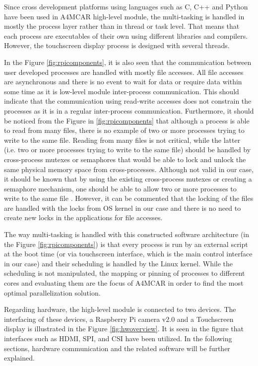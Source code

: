 Since cross development platforms using languages such as C, C++ and Python have been used in A4MCAR high-level module, the multi-tasking is handled in mostly the process layer rather than in thread or task level. That means that each process are executables of their own using different libraries and compilers. However, the touchscreen display process is designed with several threads.

In the Figure \ref{fig:rpicomponents}, it is also seen that the communication between user developed processes are handled with mostly file accesses. All file accesses are asynchronous and there is no event to wait for data or require data within some time as it is low-level module inter-process communication. This should indicate that the communication using read-write accesses does not constrain the processes as it is in a regular inter-process communication. Furthermore, it should be noticed from the Figure in \ref{fig:rpicomponents} that although a process is able to read from many files, there is no example of two or more processes trying to write to the same file. Reading from many files is not critical, while the latter (i.e. two or more processes trying to write to the same file) should be handled by cross-process mutexes or semaphores that would be able to lock and unlock the same physical memory space from cross-processes. Although not valid in our case, it should be known that by using the existing cross-process mutexes or creating a semaphore mechanism, one should be able to allow two or more processes to write to the same file \cite{linuxkernelbook}. However, it can be commented that the locking of the files are handled with the locks from OS kernel in our case and there is no need to create new locks in the applications for file accesses.

The way multi-tasking is handled with this constructed software architecture (in the Figure \ref{fig:rpicomponents}) is that every process is run by an external script at the boot time (or via touchscreen interface, which is the main control interface in our case) and their scheduling is handled by the Linux kernel. While the scheduling is not manipulated, the mapping or pinning of processes to different cores and evaluating them are the focus of A4MCAR in order to find the most optimal parallelization solution.

Regarding hardware, the high-level module is connected to two devices. The interfacing of these devices, a Raspberry Pi camera v2.0 and a Touchscreen display is illustrated in the Figure \ref{fig:hwoverview}. It is seen in the figure that interfaces such as HDMI, SPI, and CSI have been utilized. In the following sections, hardware communication and the related software will be further explained.
